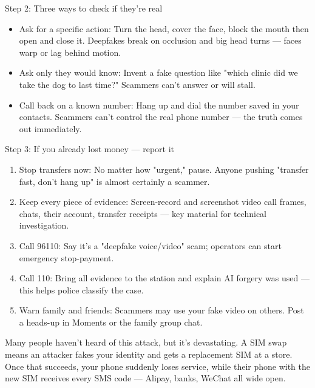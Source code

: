 \begin{tcbinfo}{Step 2: Three ways to check if they're real}
\begin{itemize}
  \item Ask for a specific action: Turn the head, cover the face, block the mouth then open and close it. Deepfakes break on occlusion and big head turns — faces warp or lag behind motion.
  \item Ask only they would know: Invent a fake question like "which clinic did we take the dog to last time?" Scammers can't answer or will stall.
  \item Call back on a known number: Hang up and dial the number saved in your contacts. Scammers can't control the real phone number — the truth comes out immediately.
\end{itemize}

\end{tcbinfo}

\begin{tcbwarn}{Step 3: If you already lost money — report it}
\begin{enumerate}
  \item Stop transfers now: No matter how "urgent," pause. Anyone pushing "transfer fast, don't hang up" is almost certainly a scammer.
  \item Keep every piece of evidence: Screen-record and screenshot video call frames, chats, their account, transfer receipts — key material for technical investigation.
  \item Call 96110: Say it's a "deepfake voice/video" scam; operators can start emergency stop-payment.
  \item Call 110: Bring all evidence to the station and explain AI forgery was used — this helps police classify the case.
  \item Warn family and friends: Scammers may use your fake video on others. Post a heads-up in Moments or the family group chat.
\end{enumerate}

\end{tcbwarn}


Many people haven't heard of this attack, but it's devastating. A SIM swap means an attacker fakes your identity and gets a replacement SIM at a store. Once that succeeds, your phone suddenly loses service, while their phone with the new SIM receives every SMS code — Alipay, banks, WeChat all wide open.


